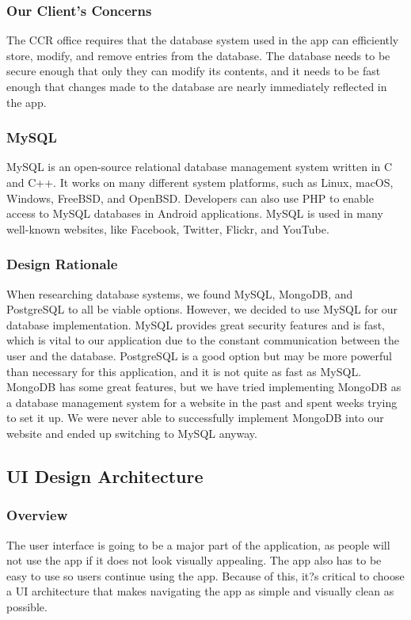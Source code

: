 \documentclass[draftclsnofoot, onecolumn, 10pt, compsoc]{IEEEtran}
\begin{document}
			\subsubsection{Our Client's Concerns}
				The CCR office requires that the database system used in the app can efficiently store, modify, and remove entries from the database. The database needs to be secure enough that only they can modify its contents, and it needs to be fast enough that changes made to the database are nearly immediately reflected in the app.
			\subsubsection{MySQL}
				MySQL is an open-source relational database management system written in C and C++. It works on many different system platforms, such as Linux, macOS, Windows, FreeBSD, and OpenBSD. Developers can also use PHP to enable access to MySQL databases in Android applications. MySQL is used in many well-known websites, like Facebook, Twitter, Flickr, and YouTube.
				~\cite{MySQL}
			\subsubsection{Design Rationale}
				When researching database systems, we found MySQL, MongoDB, and PostgreSQL to all be viable options. However, we decided to use MySQL for our database implementation. MySQL provides great security features and is fast, which is vital to our application due to the constant communication between the user and the database. PostgreSQL is a good option but may be more powerful than necessary for this application, and it is not quite as fast as MySQL. MongoDB has some great features, but we have tried implementing MongoDB as a database management system for a website in the past and spent weeks trying to set it up. We were never able to successfully implement MongoDB into our website and ended up switching to MySQL anyway.
				~\cite{MySQL}
				~\cite{MySQL_vs_Postgres}

		\subsection{UI Design Architecture}
			\subsubsection{Overview}
				The user interface is going to be a major part of the application, as people will not use the app if it does not look visually appealing. The app also has to be easy to use so users continue using the app. Because of this, it?s critical to choose a UI architecture that makes navigating the app as simple and visually clean as possible.
\end{document}
